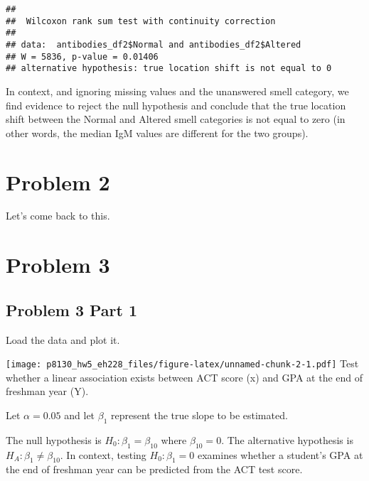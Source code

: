 \documentclass[
]{article}
\newenvironment{Shaded}{\begin{snugshade}}{\end{snugshade}}
\newcommand{\KeywordTok}[1]{\textcolor[rgb]{0.13,0.29,0.53}{\textbf{#1}}}
\newcommand{\NormalTok}[1]{#1}
\newcommand{\OperatorTok}[1]{\textcolor[rgb]{0.81,0.36,0.00}{\textbf{#1}}}
\newcommand{\StringTok}[1]{\textcolor[rgb]{0.31,0.60,0.02}{#1}}
\begin{document}
\begin{verbatim}
## 
##  Wilcoxon rank sum test with continuity correction
## 
## data:  antibodies_df2$Normal and antibodies_df2$Altered
## W = 5836, p-value = 0.01406
## alternative hypothesis: true location shift is not equal to 0
\end{verbatim}

In context, and ignoring missing values and the unanswered smell
category, we find evidence to reject the null hypothesis and conclude
that the true location shift between the Normal and Altered smell
categories is not equal to zero (in other words, the median IgM values
are different for the two groups).

\hypertarget{problem-2}{%
\section{Problem 2}\label{problem-2}}

Let's come back to this.

\hypertarget{problem-3}{%
\section{Problem 3}\label{problem-3}}

\hypertarget{problem-3-part-1}{%
\subsection{Problem 3 Part 1}\label{problem-3-part-1}}

Load the data and plot it.

\begin{Shaded}
\end{Shaded}

\texttt{[image: p8130\_hw5\_eh228\_files/figure-latex/unnamed-chunk-2-1.pdf]}
Test whether a linear association exists between ACT score (x) and GPA
at the end of freshman year (Y).

Let \(\alpha = 0.05\) and let \(\beta_1\) represent the true slope to be
estimated.

The null hypothesis is \(H_0: \beta_1 = \beta_{10}\) where
\(\beta_{10} = 0\). The alternative hypothesis is
\(H_A: \beta_1 \neq \beta_{10}\). In context, testing
\(H_0:\beta_1 = 0\) examines whether a student's GPA at the end of
freshman year can be predicted from the ACT test score.
\end{document}

